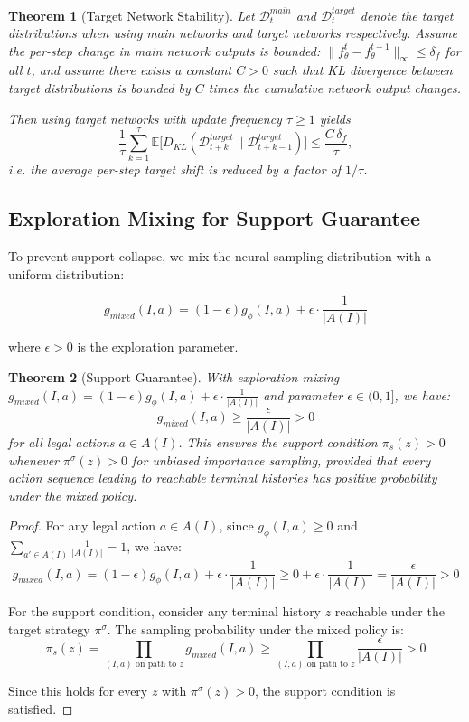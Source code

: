\documentclass[12pt,a4paper]{article}
\newtheorem{theorem}{Theorem}[section]
\begin{document}
\begin{theorem}[Target Network Stability]
\label{thm:target_network_stability}
Let $\mathcal{D}_t^{main}$ and $\mathcal{D}_t^{target}$ denote the target distributions when using main networks and target networks respectively. Assume the per-step change in main network outputs is bounded: $\|f_\theta^{t} - f_\theta^{t-1}\|_\infty \leq \delta_f$ for all $t$, and assume there exists a constant $C > 0$ such that KL divergence between target distributions is bounded by $C$ times the cumulative network output changes.

Then using target networks with update frequency $\tau \ge 1$ yields
\[
\frac{1}{\tau}\sum_{k=1}^\tau \mathbb{E}\big[D_{KL}(\mathcal{D}_{t+k}^{target}\|\mathcal{D}_{t+k-1}^{target})\big]
\le \frac{C\,\delta_f}{\tau},
\]
i.e. the average per-step target shift is reduced by a factor of $1/\tau$.

\end{theorem}

\subsection{Exploration Mixing for Support Guarantee}

To prevent support collapse, we mix the neural sampling distribution with a uniform distribution:

$$g_{mixed}(I, a) = (1 - \epsilon) g_\phi(I, a) + \epsilon \cdot \frac{1}{|A(I)|}$$

where $\epsilon > 0$ is the exploration parameter.

\begin{theorem}[Support Guarantee]
\label{thm:support_guarantee}
With exploration mixing $g_{mixed}(I, a) = (1 - \epsilon) g_\phi(I, a) + \epsilon \cdot \frac{1}{|A(I)|}$ and parameter $\epsilon \in (0,1]$, we have:
$$g_{mixed}(I, a) \geq \frac{\epsilon}{|A(I)|} > 0$$
for all legal actions $a \in A(I)$. This ensures the support condition $\pi_s(z) > 0$ whenever $\pi^\sigma(z) > 0$ for unbiased importance sampling, provided that every action sequence leading to reachable terminal histories has positive probability under the mixed policy.
\end{theorem}

\begin{proof}
For any legal action $a \in A(I)$, since $g_\phi(I, a) \geq 0$ and $\sum_{a' \in A(I)} \frac{1}{|A(I)|} = 1$, we have:
$$g_{mixed}(I, a) = (1 - \epsilon) g_\phi(I, a) + \epsilon \cdot \frac{1}{|A(I)|} \geq 0 + \epsilon \cdot \frac{1}{|A(I)|} = \frac{\epsilon}{|A(I)|} > 0$$

For the support condition, consider any terminal history $z$ reachable under the target strategy $\pi^\sigma$. The sampling probability under the mixed policy is:
$$\pi_s(z) = \prod_{(I,a) \text{ on path to } z} g_{mixed}(I, a) \geq \prod_{(I,a) \text{ on path to } z} \frac{\epsilon}{|A(I)|} > 0$$

Since this holds for every $z$ with $\pi^\sigma(z) > 0$, the support condition is satisfied.
\end{proof}
\end{document}
